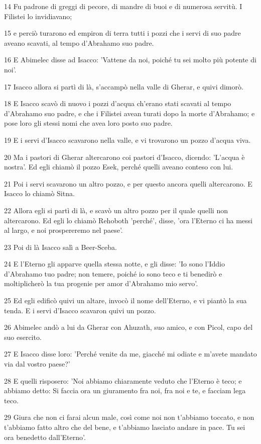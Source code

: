 \par 14 Fu padrone di greggi di pecore, di mandre di buoi e di numerosa servitù. I Filistei lo invidiavano;
\par 15 e perciò turarono ed empiron di terra tutti i pozzi che i servi di suo padre aveano scavati, al tempo d'Abrahamo suo padre.
\par 16 E Abimelec disse ad Isacco: 'Vattene da noi, poiché tu sei molto più potente di noi'.
\par 17 Isacco allora si partì di là, s'accampò nella valle di Gherar, e quivi dimorò.
\par 18 E Isacco scavò di nuovo i pozzi d'acqua ch'erano stati scavati al tempo d'Abrahamo suo padre, e che i Filistei avean turati dopo la morte d'Abrahamo; e pose loro gli stessi nomi che avea loro posto suo padre.
\par 19 E i servi d'Isacco scavarono nella valle, e vi trovarono un pozzo d'acqua viva.
\par 20 Ma i pastori di Gherar altercarono coi pastori d'Isacco, dicendo: 'L'acqua è nostra'. Ed egli chiamò il pozzo Esek, perché quelli aveano conteso con lui.
\par 21 Poi i servi scavarono un altro pozzo, e per questo ancora quelli altercarono. E Isacco lo chiamò Sitna.
\par 22 Allora egli si partì di là, e scavò un altro pozzo per il quale quelli non altercarono. Ed egli lo chiamò Rehoboth 'perché', disse, 'ora l'Eterno ci ha messi al largo, e noi prospereremo nel paese'.
\par 23 Poi di là Isacco salì a Beer-Sceba.
\par 24 E l'Eterno gli apparve quella stessa notte, e gli disse: 'Io sono l'Iddio d'Abrahamo tuo padre; non temere, poiché io sono teco e ti benedirò e moltiplicherò la tua progenie per amor d'Abrahamo mio servo'.
\par 25 Ed egli edificò quivi un altare, invocò il nome dell'Eterno, e vi piantò la sua tenda. E i servi d'Isacco scavaron quivi un pozzo.
\par 26 Abimelec andò a lui da Gherar con Ahuzath, suo amico, e con Picol, capo del suo esercito.
\par 27 E Isacco disse loro: 'Perché venite da me, giacché mi odiate e m'avete mandato via dal vostro paese?'
\par 28 E quelli risposero: 'Noi abbiamo chiaramente veduto che l'Eterno è teco; e abbiamo detto: Si faccia ora un giuramento fra noi, fra noi e te, e facciam lega teco.
\par 29 Giura che non ci farai alcun male, così come noi non t'abbiamo toccato, e non t'abbiamo fatto altro che del bene, e t'abbiamo lasciato andare in pace. Tu sei ora benedetto dall'Eterno'.
